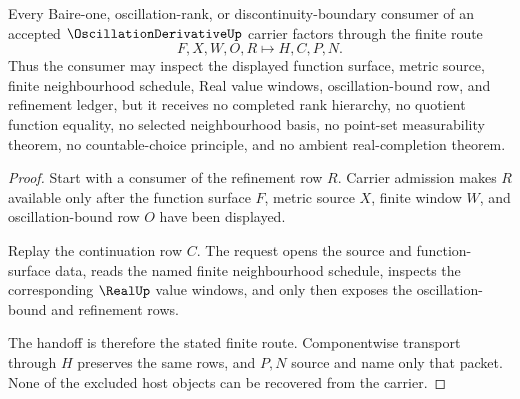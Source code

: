 \begin{theorem}
\label{thm:oscillation-derivative-finite-window-handoff}
Every Baire-one, oscillation-rank, or discontinuity-boundary consumer of an accepted $\OscillationDerivativeUp$ carrier factors through the finite route
$$
F,X,W,O,R \longmapsto H,C,P,N .
$$
Thus the consumer may inspect the displayed function surface, metric source, finite neighbourhood schedule, Real value windows, oscillation-bound row, and refinement ledger, but it receives no completed rank hierarchy, no quotient function equality, no selected neighbourhood basis, no point-set measurability theorem, no countable-choice principle, and no ambient real-completion theorem.
\end{theorem}
\begin{proof}
Start with a consumer of the refinement row $R$. Carrier admission makes $R$ available only after the function surface $F$, metric source $X$, finite window $W$, and oscillation-bound row $O$ have been displayed.

Replay the continuation row $C$. The request opens the source and function-surface data, reads the named finite neighbourhood schedule, inspects the corresponding $\RealUp$ value windows, and only then exposes the oscillation-bound and refinement rows.

The handoff is therefore the stated finite route. Componentwise transport through $H$ preserves the same rows, and $P,N$ source and name only that packet. None of the excluded host objects can be recovered from the carrier.
\end{proof}



